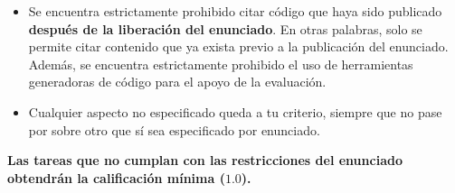 \begin{itemize}
    \item Se encuentra estrictamente prohibido citar código que haya sido publicado \textbf{después de la liberación del enunciado}. En otras palabras, solo se permite citar contenido que ya exista previo a la publicación del enunciado. Además, se encuentra estrictamente prohibido el uso de herramientas generadoras de código para el apoyo de la evaluación.
    
    \item Cualquier aspecto no especificado queda a tu criterio, siempre que no pase por sobre otro que sí sea especificado por enunciado.
\end{itemize}
\medskip
\textbf{Las tareas que no cumplan con las restricciones del enunciado obtendrán la calificación mínima ($1.0$).}